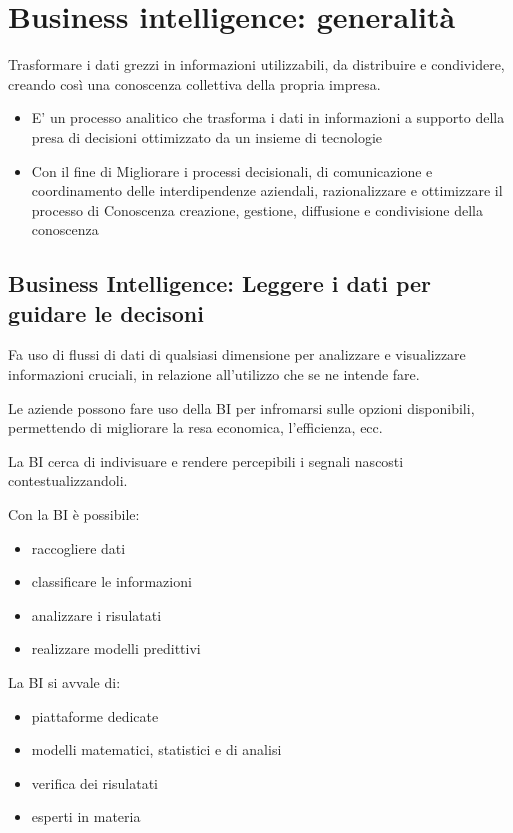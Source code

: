 \section{Business intelligence: generalità}
Trasformare i dati grezzi in informazioni
utilizzabili, da distribuire e condividere, creando così una conoscenza
collettiva della propria impresa.

\begin{itemize}
    \item E’ un processo analitico che trasforma i dati in informazioni
    a supporto della presa di decisioni ottimizzato da un
    insieme di tecnologie
    \item Con
    il fine di Migliorare i processi decisionali, di
    comunicazione e coordinamento delle interdipendenze
    aziendali, razionalizzare e ottimizzare il processo di Conoscenza
    creazione, gestione, diffusione e condivisione della
    conoscenza
\end{itemize}
\subsection{Business Intelligence: Leggere i dati per guidare le decisoni}

Fa uso di flussi di dati di qualsiasi dimensione per analizzare e visualizzare informazioni cruciali,
in relazione all'utilizzo che se ne intende fare.

Le aziende possono fare uso della BI per infromarsi sulle opzioni disponibili, permettendo di
migliorare la resa economica, l'efficienza, ecc.

La BI cerca di indivisuare e rendere percepibili i segnali nascosti contestualizzandoli.

Con la BI è possibile:
\begin{itemize}
    \item raccogliere dati
    \item classificare le informazioni
    \item analizzare i risulatati
    \item realizzare modelli predittivi
\end{itemize}

La BI si avvale di:
\begin{itemize}
    \item piattaforme dedicate
    \item modelli matematici, statistici e di analisi
    \item verifica dei risulatati
    \item esperti in materia
\end{itemize}

